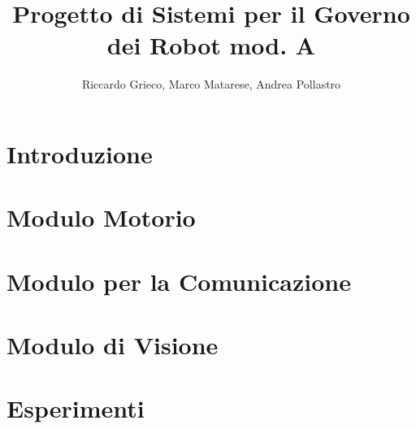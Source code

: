 \documentclass[12pt]{article}
\title{Progetto di Sistemi per il Governo dei Robot mod. A}
\author{Riccardo Grieco, Marco Matarese, Andrea Pollastro}
\begin{document}
	
	\newpage
	
	\tableofcontents
	
	\newpage
	
	\section{Introduzione}	%
		
		\newpage
		
	\section{Modulo Motorio}
		\newpage
		
	\section{Modulo per la Comunicazione}
		
		\newpage
		
	\section{Modulo di Visione}
		
		\newpage
	
	\section{Esperimenti}
		\newpage
	
\end{document}
